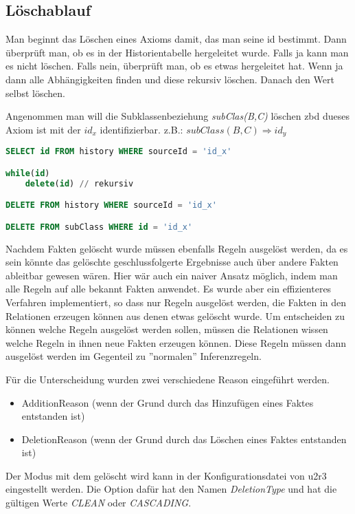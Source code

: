 \subsection{Löschablauf}
Man beginnt das Löschen eines Axioms damit, das man seine id bestimmt. Dann überprüft man, ob es in der Historientabelle hergeleitet wurde. Falls ja kann man es nicht löschen. Falls nein, überprüft man, ob es etwas hergeleitet hat. Wenn ja dann alle Abhängigkeiten finden und diese rekursiv löschen. Danach den Wert selbst löschen.

Angenommen man will die Subklassenbeziehung \emph{subClas(B,C)} löschen zbd dueses Axiom ist mit der $id_x$ identifizierbar.
z.B.: $subClass(B,C) \Rightarrow id_y$
\begin{lstlisting}[language=SQL]
SELECT id FROM history WHERE sourceId = 'id_x'

while(id)
	delete(id) // rekursiv

DELETE FROM history WHERE sourceId = 'id_x'

DELETE FROM subClass WHERE id = 'id_x'
\end{lstlisting}


Nachdem Fakten gelöscht wurde müssen ebenfalls Regeln ausgelöst werden, da es sein könnte das gelöschte geschlussfolgerte Ergebnisse auch über andere Fakten ableitbar gewesen wären. 
Hier wär auch ein naiver Ansatz möglich, indem man alle Regeln auf alle bekannt Fakten anwendet. Es wurde aber ein effizienteres Verfahren implementiert, so dass nur Regeln ausgelöst werden, die Fakten in den Relationen erzeugen können aus denen etwas gelöscht wurde.
Um entscheiden zu können welche Regeln ausgelöst werden sollen, müssen die Relationen wissen welche Regeln in ihnen neue Fakten erzeugen können. Diese Regeln müssen dann ausgelöst werden im Gegenteil zu ''normalen'' Inferenzregeln.

Für die Unterscheidung wurden zwei verschiedene Reason eingeführt werden.
\begin{itemize}
  \item AdditionReason (wenn der Grund durch das Hinzufügen eines Faktes entstanden ist)
  \item DeletionReason (wenn der Grund durch das Löschen eines Faktes entstanden ist)
\end{itemize}

Der Modus mit dem gelöscht wird kann in der Konfigurationsdatei von u2r3 eingestellt werden. Die Option dafür hat den Namen \emph{DeletionType} und hat die gültigen Werte \emph{CLEAN} oder \emph{CASCADING}.


